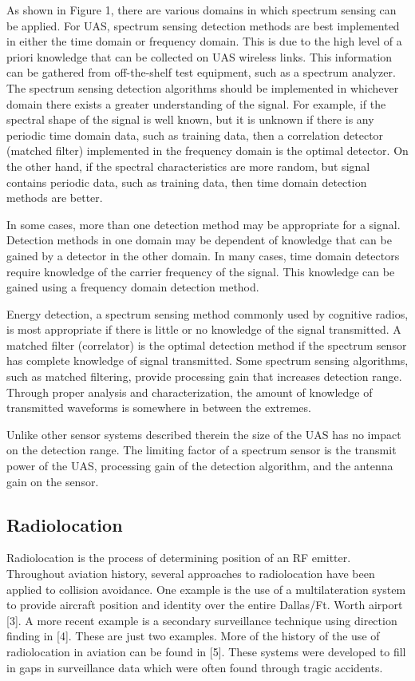 \documentclass[journal,transmag]{IEEEtran}
\begin{document}
As shown in Figure 1, there are various domains in which spectrum sensing can be applied. For UAS, spectrum sensing detection methods are best implemented in either the time domain or frequency domain. This is due to the high level of a priori knowledge that can be collected on UAS wireless links. This information can be gathered from off-the-shelf test equipment, such as a spectrum analyzer.
The spectrum sensing detection algorithms should be implemented in whichever domain there exists a greater understanding of the signal.  For example, if the spectral shape of the signal is well known, but it is unknown if there is any periodic time domain data, such as training data, then a correlation detector (matched filter) implemented in the frequency domain is the optimal detector.  On the other hand, if the spectral characteristics are more random, but signal contains periodic data, such as training data, then time domain detection methods are better.

In some cases, more than one detection method may be appropriate for a signal. Detection methods in one domain may be dependent of knowledge that can be gained by a detector in the other domain. In many cases, time domain detectors require knowledge of the carrier frequency of the signal. This knowledge can be gained using a frequency domain detection method.

Energy detection, a spectrum sensing method commonly used by cognitive radios, is most appropriate if there is little or no knowledge of the signal transmitted. A matched filter (correlator) is the optimal detection method if the spectrum sensor has complete knowledge of signal transmitted. Some spectrum sensing algorithms, such as matched filtering, provide processing gain that increases detection range. Through proper analysis and characterization, the amount of knowledge of transmitted waveforms is somewhere in between the extremes.

Unlike other sensor systems described therein the size of the UAS has no impact on the detection range. The limiting factor of a spectrum sensor is the transmit power of the UAS, processing gain of the detection algorithm, and the antenna gain on the sensor. 

\subsection{Radiolocation}
Radiolocation is the process of determining position of an RF emitter. Throughout aviation history, several approaches to radiolocation have been applied to collision avoidance. One example is the use of a multilateration system to provide aircraft position and identity over the entire Dallas/Ft. Worth airport [3]. A more recent example is a secondary surveillance technique using direction finding in [4]. These are just two examples. More of the history of the use of radiolocation in aviation can be found in [5]. These systems were developed to fill in gaps in surveillance data which were often found through tragic accidents.
\end{document}
